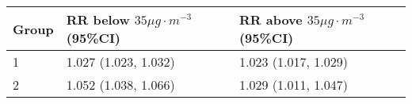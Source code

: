 \begin{tabular}{lll}
  \hline
Group & RR below $35 \mu g \cdot m^{-3}$ (95\%CI) & RR above $35 \mu g \cdot m^{-3}$ (95\%CI) \\ 
  \hline
   1 & 1.027 (1.023, 1.032) & 1.023 (1.017, 1.029) \\ 
     2 & 1.052 (1.038, 1.066) & 1.029 (1.011, 1.047) \\ 
   \hline
\end{tabular}

